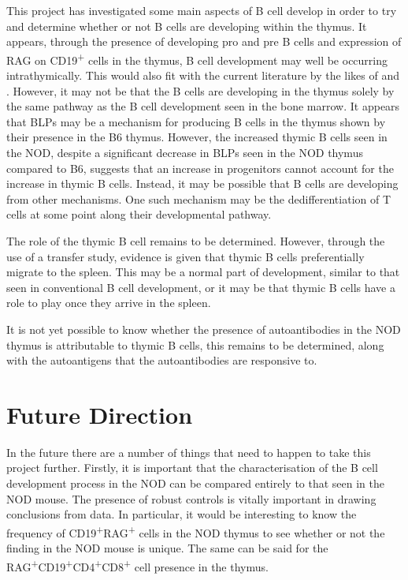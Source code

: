 This project has investigated some main aspects of B cell develop in order to try and determine whether or not B cells are developing within the thymus.
It appears, through the presence of developing pro and pre B cells and expression of RAG on CD19\textsuperscript{+} cells in the thymus, B cell development may well be occurring intrathymically.
This would also fit with the current literature by the likes of \citet{Akashi2000} and \citet{Perera2013}.
However, it may not be that the B cells are developing in the thymus solely by the same pathway as the B cell development seen in the bone marrow.
It appears that BLPs may be a mechanism for producing B cells in the thymus shown by their presence in the B6 thymus.
However, the increased thymic B cells seen in the NOD, despite a significant decrease in BLPs seen in the NOD thymus compared to B6, suggests that an increase in progenitors cannot account for the increase in thymic B cells.
Instead, it may be possible that B cells are developing from other mechanisms.
One such mechanism may be the dedifferentiation of T cells at some point along their developmental pathway.

The role of the thymic B cell remains to be determined.
However, through the use of a transfer study, evidence is given that thymic B cells preferentially migrate to the spleen.
This may be a normal part of development, similar to that seen in conventional B cell development, or it may be that thymic B cells have a role to play once they arrive in the spleen.

It is not yet possible to know whether the presence of autoantibodies in the NOD thymus is attributable to thymic B cells, this remains to be determined, along with the autoantigens that the autoantibodies are responsive to.


\section{Future Direction}

In the future there are a number of things that need to happen to take this project further.
Firstly, it is important that the characterisation of the B cell development process in the NOD can be compared entirely to that seen in the NOD mouse.
The presence of robust controls is vitally important in drawing conclusions from data.
In particular, it would be interesting to know the frequency of CD19\textsuperscript{+}RAG\textsuperscript{+} cells in the NOD thymus to see whether or not the finding in the NOD mouse is unique.
The same can be said for the RAG\textsuperscript{+}CD19\textsuperscript{+}CD4\textsuperscript{+}CD8\textsuperscript{+} cell presence in the thymus.

